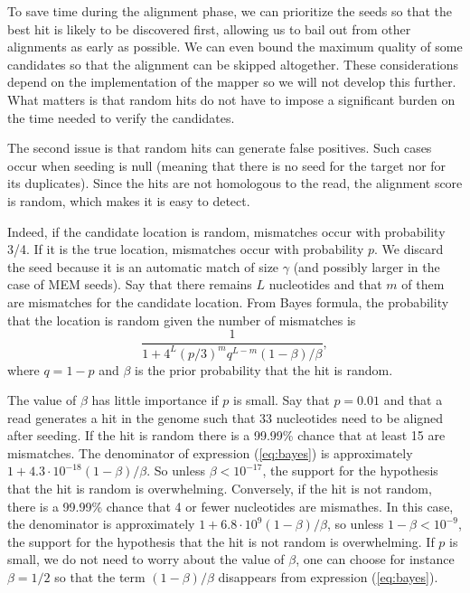 \documentclass{article}
\begin{document}
To save time during the alignment phase, we can prioritize the seeds so
that the best hit is likely to be discovered first, allowing us to bail
out from other alignments as early as possible. We can even bound the
maximum quality of some candidates so that the alignment can be skipped
altogether. These considerations depend on the implementation of the
mapper so we will not develop this further. What matters is that random
hits do not have to impose a significant burden on the time needed to
verify the candidates.

The second issue is that random hits can generate false positives. Such
cases occur when seeding is null (meaning that there is no seed for the
target nor for its duplicates). Since the hits are not homologous to the
read, the alignment score is random, which makes it is easy to detect.

Indeed, if the candidate location is random, mismatches occur with
probability 3/4. If it is the true location, mismatches occur with
probability $p$. We discard the seed because it is an automatic match of
size $\gamma$ (and possibly larger in the case of MEM seeds). Say that
there remains $L$ nucleotides and that $m$ of them are mismatches for the
candidate location. From Bayes formula, the probability that the location
is random given the number of mismatches is
\begin{equation}
\label{eq:bayes}
\frac{1}{1 + 4^L(p/3)^mq^{L-m}(1-\beta)/\beta},
\end{equation}
where $q=1-p$ and $\beta$ is the prior probability that the hit is
random.

The value of $\beta$ has little importance if $p$ is small. Say that
$p=0.01$ and that a read generates a hit in the genome such that 33
nucleotides need to be aligned after seeding. If the hit is random there
is a 99.99\% chance that at least 15 are mismatches. The denominator of
expression (\ref{eq:bayes}) is approximately $1 +
4.3\cdot10^{-18}(1-\beta)/\beta$. So unless $\beta < 10^{-17}$, the
support for the hypothesis that the hit is random is overwhelming.
Conversely, if the hit is not random, there is a 99.99\% chance that 4 or
fewer nucleotides are mismathes. In this case, the denominator is
approximately $1+6.8\cdot10^9(1-\beta)/\beta$, so unless $1-\beta <
10^{-9}$, the support for the hypothesis that the hit is not random is
overwhelming. If $p$ is small, we do not need to worry about the value of
$\beta$, one can choose for instance $\beta=1/2$ so that the term
$(1-\beta)/\beta$ disappears from expression (\ref{eq:bayes}).
\end{document}
